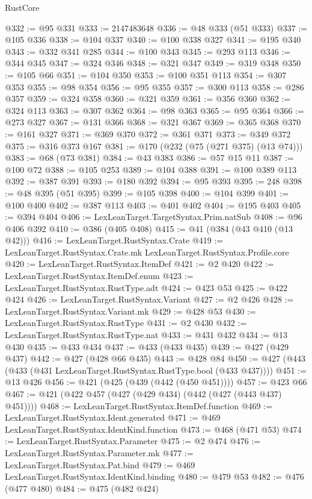 \begin{lexlean}{RustCore}
\begin{coremodule}
@332 := @95 @331
@333 := 2147483648
@336 := @48 @333 (@51 @333)
@337 := @105 @336
@338 := @104 @337
@340 := @100 @338 @327
@341 := @195 @340
@343 := @332 @341 @285
@344 := @100 @343
@345 := @293 @113
@346 := @344 @345
@347 := @324 @346
@348 := @321 @347
@349 := @319 @348
@350 := @105 @66
@351 := @104 @350
@353 := @100 @351 @113
@354 := @307 @353
@355 := @98 @354
@356 := @95 @355
@357 := @300 @113
@358 := @286 @357
@359 := @324 @358
@360 := @321 @359
@361 := @356 @360
@362 := @324 @113
@363 := @307 @362
@364 := @98 @363
@365 := @95 @364
@366 := @273 @327
@367 := @131 @366
@368 := @321 @367
@369 := @365 @368
@370 := @161 @327
@371 := @369 @370
@372 := @361 @371
@373 := @349 @372
@375 := @316 @373 @167
@381 := @170 (@232 (@75 (@271 @375) (@13 @74)))
@383 := @68 (@73 @381)
@384 := @43 @383
@386 := @57 @15 @11
@387 := @100 @72
@388 := @105 @253
@389 := @104 @388
@391 := @100 @389 @113
@392 := @387 @391
@393 := @180 @392
@394 := @95 @393
@395 := 248
@398 := @48 @395 (@51 @395)
@399 := @105 @398
@400 := @104 @399
@401 := @100 @400
@402 := @387 @113
@403 := @401 @402
@404 := @195 @403
@405 := @394 @404
@406 := LexLeanTarget.TargetSyntax.Prim.natSub
@408 := @96 @406 @392
@410 := @386 (@405 @408)
@415 := @41 (@384 (@43 @410 (@13 @42)))
@416 := LexLeanTarget.RustSyntax.Crate
@419 := LexLeanTarget.RustSyntax.Crate.mk LexLeanTarget.RustSyntax.Profile.core
@420 := LexLeanTarget.RustSyntax.ItemDef
@421 := @2 @420
@422 := LexLeanTarget.RustSyntax.ItemDef.enum
@423 := LexLeanTarget.RustSyntax.RustType.adt
@424 := @423 @53
@425 := @422 @424
@426 := LexLeanTarget.RustSyntax.Variant
@427 := @2 @426
@428 := LexLeanTarget.RustSyntax.Variant.mk
@429 := @428 @53
@430 := LexLeanTarget.RustSyntax.RustType
@431 := @2 @430
@432 := LexLeanTarget.RustSyntax.RustType.nat
@433 := @431 @432
@434 := @13 @430
@435 := @433 @434
@437 := @433 (@433 @435)
@439 := @427 (@429 @437)
@442 := @427 (@428 @66 @435)
@443 := @428 @84
@450 := @427 (@443 (@433 (@431 LexLeanTarget.RustSyntax.RustType.bool (@433 @437))))
@451 := @13 @426
@456 := @421 (@425 (@439 (@442 (@450 @451))))
@457 := @423 @66
@467 := @421 (@422 @457 (@427 (@429 @434) (@442 (@427 (@443 @437) @451))))
@468 := LexLeanTarget.RustSyntax.ItemDef.function
@469 := LexLeanTarget.RustSyntax.Ident.generated
@471 := @469 LexLeanTarget.RustSyntax.IdentKind.function
@473 := @468 (@471 @53)
@474 := LexLeanTarget.RustSyntax.Parameter
@475 := @2 @474
@476 := LexLeanTarget.RustSyntax.Parameter.mk
@477 := LexLeanTarget.RustSyntax.Pat.bind
@479 := @469 LexLeanTarget.RustSyntax.IdentKind.binding
@480 := @479 @53
@482 := @476 (@477 @480)
@484 := @475 (@482 @424)

\end{coremodule}
\end{lexlean}
